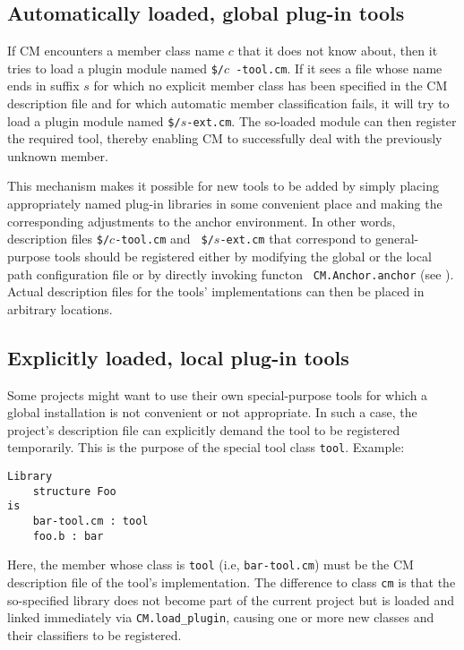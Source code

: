 \subsection{Automatically loaded, global plug-in tools}

If CM encounters a member class name $c$ that it does not know about,
then it tries to load a plugin module named {\tt \$/}$c${\tt
-tool.cm}.  If it sees a file whose name ends in suffix $s$ for which
no explicit member class has been specified in the CM description file
and for which automatic member classification fails, it will try to
load a plugin module named {\tt \$/}$s${\tt -ext.cm}.  The so-loaded
module can then register the required tool, thereby enabling CM to
successfully deal with the previously unknown member.

This mechanism makes it possible for new tools to be added by simply
placing appropriately named plug-in libraries in some convenient place
and making the corresponding adjustments to the anchor environment.
In other words, description files {\tt \$/}$c${\tt -tool.cm} and {\tt
\$/}$s${\tt -ext.cm} that correspond to general-purpose tools should
be registered either by modifying the global or the local path
configuration file or by directly invoking functon {\tt
CM.Anchor.anchor} (see ).  Actual
description files for the tools' implementations can then be placed in
arbitrary locations.

\subsection{Explicitly loaded, local plug-in tools}
\label{sec:localtools}

Some projects might want to use their own special-purpose tools for
which a global installation is not convenient or not appropriate.  In
such a case, the project's description file can explicitly demand the
tool to be registered temporarily.  This is the purpose of the special
tool class {\tt tool}.  Example:

\begin{lstlisting}
Library
    structure Foo
is
    bar-tool.cm : tool
    foo.b : bar
\end{lstlisting}%

Here, the member whose class is {\tt tool} (i.e, {\tt bar-tool.cm})
must be the CM description file of the tool's implementation.  The
difference to class {\tt cm} is that the so-specified library does not
become part of the current project but is loaded and linked
immediately via {\tt CM.load\_plugin}, causing one or more new classes
and their classifiers to be registered.

